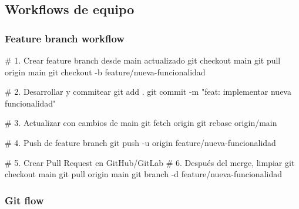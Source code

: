 \documentclass[
  11pt,
  letterpaper,
  oneside,
  openany]{scrbook}
\newenvironment{Shaded}{}{}
\newcommand{\AttributeTok}[1]{\textcolor[rgb]{0.84,0.23,0.29}{#1}}
\newcommand{\CommentTok}[1]{\textcolor[rgb]{0.42,0.45,0.49}{#1}}
\newcommand{\FunctionTok}[1]{\textcolor[rgb]{0.44,0.26,0.76}{#1}}
\newcommand{\NormalTok}[1]{\textcolor[rgb]{0.14,0.16,0.18}{#1}}
\newcommand{\StringTok}[1]{\textcolor[rgb]{0.01,0.18,0.38}{#1}}
\begin{document}
\subsection{Workflows de equipo}\label{workflows-de-equipo}

\subsubsection{Feature branch workflow}\label{feature-branch-workflow}

\begin{Shaded}
\begin{Highlighting}[]
\CommentTok{\# 1. Crear feature branch desde main actualizado}
\FunctionTok{git}\NormalTok{ checkout main}
\FunctionTok{git}\NormalTok{ pull origin main}
\FunctionTok{git}\NormalTok{ checkout }\AttributeTok{{-}b}\NormalTok{ feature/nueva{-}funcionalidad}

\CommentTok{\# 2. Desarrollar y commitear}
\FunctionTok{git}\NormalTok{ add .}
\FunctionTok{git}\NormalTok{ commit }\AttributeTok{{-}m} \StringTok{"feat: implementar nueva funcionalidad"}

\CommentTok{\# 3. Actualizar con cambios de main}
\FunctionTok{git}\NormalTok{ fetch origin}
\FunctionTok{git}\NormalTok{ rebase origin/main}

\CommentTok{\# 4. Push de feature branch}
\FunctionTok{git}\NormalTok{ push }\AttributeTok{{-}u}\NormalTok{ origin feature/nueva{-}funcionalidad}

\CommentTok{\# 5. Crear Pull Request en GitHub/GitLab}
\CommentTok{\# 6. Después del merge, limpiar}
\FunctionTok{git}\NormalTok{ checkout main}
\FunctionTok{git}\NormalTok{ pull origin main}
\FunctionTok{git}\NormalTok{ branch }\AttributeTok{{-}d}\NormalTok{ feature/nueva{-}funcionalidad}
\end{Highlighting}
\end{Shaded}

\subsubsection{Git flow}\label{git-flow}
\end{document}
